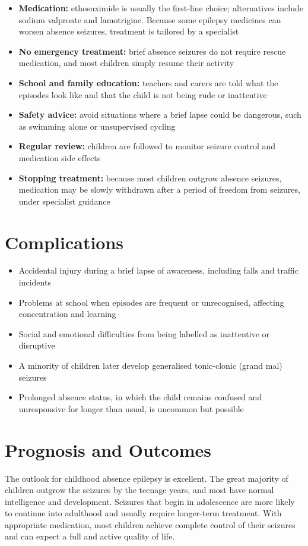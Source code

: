 \begin{itemize}
    \item \textbf{Medication:} ethosuximide is usually the first-line choice; alternatives include sodium valproate and lamotrigine. Because some epilepsy medicines can worsen absence seizures, treatment is tailored by a specialist
    \item \textbf{No emergency treatment:} brief absence seizures do not require rescue medication, and most children simply resume their activity
    \item \textbf{School and family education:} teachers and carers are told what the episodes look like and that the child is not being rude or inattentive
    \item \textbf{Safety advice:} avoid situations where a brief lapse could be dangerous, such as swimming alone or unsupervised cycling
    \item \textbf{Regular review:} children are followed to monitor seizure control and medication side effects
    \item \textbf{Stopping treatment:} because most children outgrow absence seizures, medication may be slowly withdrawn after a period of freedom from seizures, under specialist guidance
\end{itemize}

\section*{Complications}
\begin{itemize}
    \item Accidental injury during a brief lapse of awareness, including falls and traffic incidents
    \item Problems at school when episodes are frequent or unrecognised, affecting concentration and learning
    \item Social and emotional difficulties from being labelled as inattentive or disruptive
    \item A minority of children later develop generalised tonic-clonic (grand mal) seizures
    \item Prolonged absence status, in which the child remains confused and unresponsive for longer than usual, is uncommon but possible
\end{itemize}

\section*{Prognosis and Outcomes}
The outlook for childhood absence epilepsy is excellent. The great majority of children outgrow the seizures by the teenage years, and most have normal intelligence and development. Seizures that begin in adolescence are more likely to continue into adulthood and usually require longer-term treatment. With appropriate medication, most children achieve complete control of their seizures and can expect a full and active quality of life.

